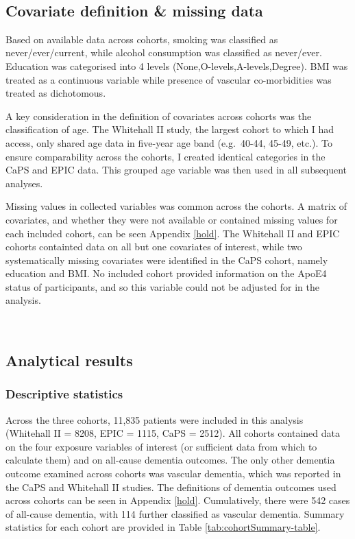 \documentclass[a4paper, twoside]{templates/ociamthesis}
\begin{document}
~

\hypertarget{ipd-covar-definition}{%
\subsection{Covariate definition \& missing data}\label{ipd-covar-definition}}

Based on available data across cohorts, smoking was classified as never/ever/current, while alcohol consumption was classified as never/ever. Education was categorised into 4 levels (None,O-levels,A-levels,Degree). BMI was treated as a continuous variable while presence of vascular co-morbidities was treated as dichotomous.

A key consideration in the definition of covariates across cohorts was the classification of age. The Whitehall II study, the largest cohort to which I had access, only shared age data in five-year age band (e.g.~40-44, 45-49, etc.). To ensure comparability across the cohorts, I created identical categories in the CaPS and EPIC data. This grouped age variable was then used in all subsequent analyses.

Missing values in collected variables was common across the cohorts. A matrix of covariates, and whether they were not available or contained missing values for each included cohort, can be seen Appendix \ref{hold}. The Whitehall II and EPIC cohorts containted data on all but one covariates of interest, while two systematically missing covariates were identified in the CaPS cohort, namely education and BMI. No included cohort provided information on the ApoE4 status of participants, and so this variable could not be adjusted for in the analysis.

~

\hypertarget{analytical-results}{%
\subsection{Analytical results}\label{analytical-results}}

\hypertarget{descriptive-statistics}{%
\subsubsection{Descriptive statistics}\label{descriptive-statistics}}

Across the three cohorts, 11,835 patients were included in this analysis (Whitehall II = 8208, EPIC = 1115, CaPS = 2512). All cohorts contained data on the four exposure variables of interest (or sufficient data from which to calculate them) and on all-cause dementia outcomes. The only other dementia outcome examined across cohorts was vascular dementia, which was reported in the CaPS and Whitehall II studies. The definitions of dementia outcomes used across cohorts can be seen in Appendix \ref{hold}. Cumulatively, there were 542 cases of all-cause dementia, with 114 further classified as vascular dementia. Summary statistics for each cohort are provided in Table \ref{tab:cohortSummary-table}.
\end{document}
